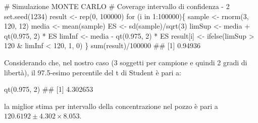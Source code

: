 \documentclass[a4paper,12pt,oneside]{book}
\newenvironment{Shaded}{\begin{snugshade}}{\end{snugshade}}
\newcommand{\DecValTok}[1]{#1}
\newcommand{\FloatTok}[1]{#1}
\newcommand{\SpecialCharTok}[1]{#1}
\newcommand{\CommentTok}[1]{#1}
\newcommand{\DocumentationTok}[1]{#1}
\newcommand{\OtherTok}[1]{#1}
\newcommand{\FunctionTok}[1]{#1}
\newcommand{\ControlFlowTok}[1]{#1}
\newcommand{\NormalTok}[1]{#1}
\begin{document}
\begin{Shaded}
\begin{Highlighting}[]
\CommentTok{\# Simulazione MONTE CARLO}
\CommentTok{\# Coverage intervallo di confidenza {-} 2}
\FunctionTok{set.seed}\NormalTok{(}\DecValTok{1234}\NormalTok{)}
\NormalTok{result }\OtherTok{\textless{}{-}} \FunctionTok{rep}\NormalTok{(}\DecValTok{0}\NormalTok{, }\DecValTok{100000}\NormalTok{)}
\ControlFlowTok{for}\NormalTok{ (i }\ControlFlowTok{in} \DecValTok{1}\SpecialCharTok{:}\DecValTok{100000}\NormalTok{)\{}
\NormalTok{  sample }\OtherTok{\textless{}{-}} \FunctionTok{rnorm}\NormalTok{(}\DecValTok{3}\NormalTok{, }\DecValTok{120}\NormalTok{, }\DecValTok{12}\NormalTok{)}
\NormalTok{  media }\OtherTok{\textless{}{-}} \FunctionTok{mean}\NormalTok{(sample)}
\NormalTok{  ES }\OtherTok{\textless{}{-}} \FunctionTok{sd}\NormalTok{(sample)}\SpecialCharTok{/}\FunctionTok{sqrt}\NormalTok{(}\DecValTok{3}\NormalTok{)}
\NormalTok{  limSup }\OtherTok{\textless{}{-}}\NormalTok{ media }\SpecialCharTok{+} \FunctionTok{qt}\NormalTok{(}\FloatTok{0.975}\NormalTok{, }\DecValTok{2}\NormalTok{) }\SpecialCharTok{*}\NormalTok{ ES}
\NormalTok{  limInf }\OtherTok{\textless{}{-}}\NormalTok{ media }\SpecialCharTok{{-}} \FunctionTok{qt}\NormalTok{(}\FloatTok{0.975}\NormalTok{, }\DecValTok{2}\NormalTok{) }\SpecialCharTok{*}\NormalTok{ ES}
\NormalTok{  result[i] }\OtherTok{\textless{}{-}} \FunctionTok{ifelse}\NormalTok{(limSup }\SpecialCharTok{\textgreater{}} \DecValTok{120} \SpecialCharTok{\&}\NormalTok{ limInf }\SpecialCharTok{\textless{}} \DecValTok{120}\NormalTok{, }\DecValTok{1}\NormalTok{, }\DecValTok{0}\NormalTok{)}
\NormalTok{\}}
\FunctionTok{sum}\NormalTok{(result)}\SpecialCharTok{/}\DecValTok{100000}
\DocumentationTok{\#\# [1] 0.94936}
\end{Highlighting}
\end{Shaded}

Considerando che, nel nostro caso (3 soggetti per campione e quindi 2 gradi di libertà), il 97.5-esimo percentile del t di Student è pari a:

\begin{Shaded}
\begin{Highlighting}[]
\FunctionTok{qt}\NormalTok{(}\FloatTok{0.975}\NormalTok{, }\DecValTok{2}\NormalTok{)}
\DocumentationTok{\#\# [1] 4.302653}
\end{Highlighting}
\end{Shaded}

la miglior stima per intervallo della concentrazione nel pozzo è pari a \(120.6192 \pm 4.302 \times 8.053\).
\end{document}

